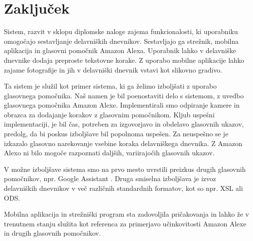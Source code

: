 \documentclass[a4paper, 12pt]{book}
\begin{document}






\chapter{Zaključek}

Sistem, razvit v sklopu diplomske naloge zajema funkcionalosti, ki uporabniku omogočajo sestavljanje delavniških dnevnikov.
Sestavljajo ga strežnik, mobilna aplikacija in glasovni pomočnik Amazon Alexa.
Uporabnik lahko v delavniške dnevnike dodaja preproste tekstovne korake.
Z uporabo mobilne aplikacije lahko zajame fotografije in jih v delavniški dnevnik vstavi kot slikovno gradivo.

Ta sistem je služil kot primer sistema, ki ga želimo izboljšati z uporabo glasovnega pomočnika.
Naš namen je bil poenostaviti delo s sistemom, z uvedbo glasovnega pomočnika Amazon Alexe.
Implementirali smo odpiranje kamere in obrazca za dodajanje korakov z glasovnim pomočnikom.
Kljub uspešni implementaciji, je bil čas, potreben za izgovorjavo in obdelavo glasovnih ukazov, predolg, da bi poskus izboljšave bil popolnoma uspešen.
Za neuspešno se je izkazalo glasovno narekovanje vsebine koraka delavniškega dnevnika.
Z Amazon Alexo ni bilo mogoče razpoznati daljših, variirajočih glasovnih ukazov.

V možne izboljšave sistema smo na prvo mesto uvrstili preizkus drugih glasovnih pomočnikov, npr. Google Assistant \cite{googleass}.
Druga smiselna izboljšava je izvoz delavniških dnevnikov v več različnih standardnih formatov, kot so npr. XSL ali ODS.

Mobilna aplikacija in strežniški program sta zadovoljila pričakovanja in lahko že v trenutnem stanju služita kot referenca za primerjavo učinkovitosti Amazon Alexe in drugih glasovnih pomočnikov.
\end{document}
